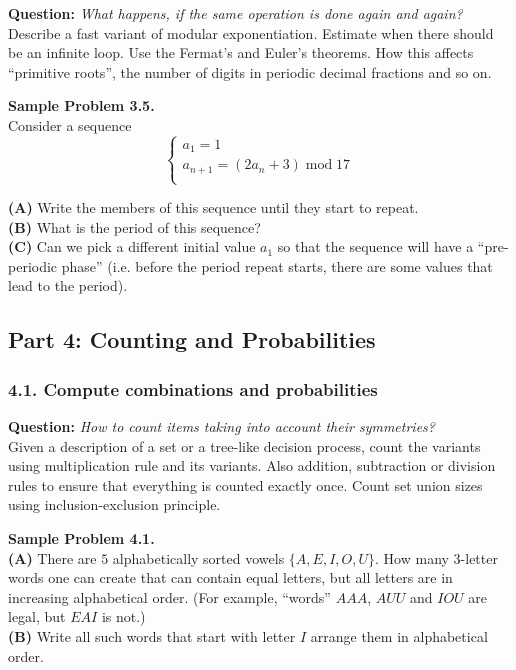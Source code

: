 \documentclass[jou]{apa6}
\begin{document}
{\bf Question:} {\em What happens, if the same operation is done again and again?}\\
{\scriptsize 
Describe a fast variant of modular exponentiation. 
Estimate when there should be an infinite loop. Use the Fermat’s and Euler’s theorems. 
How this affects ``primitive roots'', the number of digits in periodic decimal fractions and so on. 
}


\vspace{6pt}
{\bf Sample Problem 3.5.}\\
Consider a sequence
$$\left\{ \begin{array}{l}
a_1 = 1\\
a_{n+1} = (2a_n + 3)\;\text{mod}\;17\\
\end{array} \right.$$

{\bf (A)} Write the members of this sequence until they start to repeat.\\
{\bf (B)} What is the period of this sequence?\\
{\bf (C)} Can we pick a different initial value $a_1$ so that the sequence will 
have a ``pre-periodic phase'' (i.e. before the period repeat starts, there 
are some values that lead to the period).




\newpage
\subsection{Part 4: Counting and Probabilities}

\subsubsection{4.1. Compute combinations and probabilities}

{\bf Question:} {\em How to count items taking into account their symmetries?}\\
{\scriptsize 
Given a description of a set or a tree-like decision process, 
count the variants using multiplication rule and its variants. 
Also addition, subtraction or division rules \textendash{} to ensure that 
everything is counted exactly once. 
Count set union sizes using inclusion-exclusion principle.
}

\vspace{6pt}
{\bf Sample Problem 4.1.}\\ 
{\bf (A)} There are $5$ alphabetically sorted vowels $\{ A, E, I, O, U \}$. 
How many $3$-letter words one can create that can contain equal letters, 
but all letters are in increasing alphabetical order. 
(For example, ``words'' $AAA$, $AUU$ and $IOU$ are legal, but $EAI$ is not.)\\
{\bf (B)} Write all such words that start with letter $I$ \textendash{} 
arrange them in alphabetical order.
\end{document}
